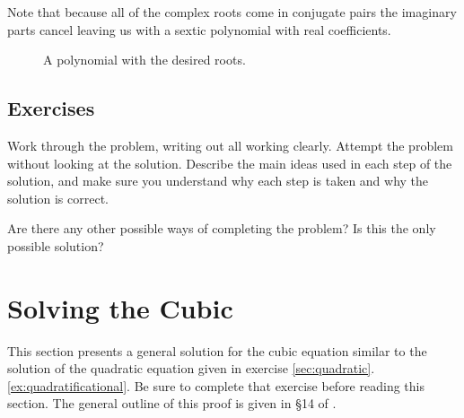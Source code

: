 \documentclass[a4paper,10pt,titlepage]{article}
\theoremstyle{definition}
\begin{document}
Note that because all of the complex roots come in conjugate pairs the imaginary parts
cancel leaving us with a sextic polynomial with real coefficients.

\begin{figure}
  \centering
  \caption{A polynomial with the desired roots.}
\end{figure}

\subsection*{Exercises}
Work through the problem, writing out all working clearly. Attempt the problem without
looking at the solution. Describe the main ideas used in each step of the solution,
and make sure you understand why each step is taken and why the solution is correct.

Are there any other possible ways of completing the problem? Is this the only possible
solution?

\section{Solving the Cubic}\label{sec:cubic}
This section presents a general solution for the cubic equation similar to the solution
of the quadratic equation given in exercise \ref{sec:quadratic}.\ref{ex:quadratificational}. Be sure to complete that
exercise before reading this section. The general outline of this proof is given in \S14
of \cite{Edw84}.
\end{document}
